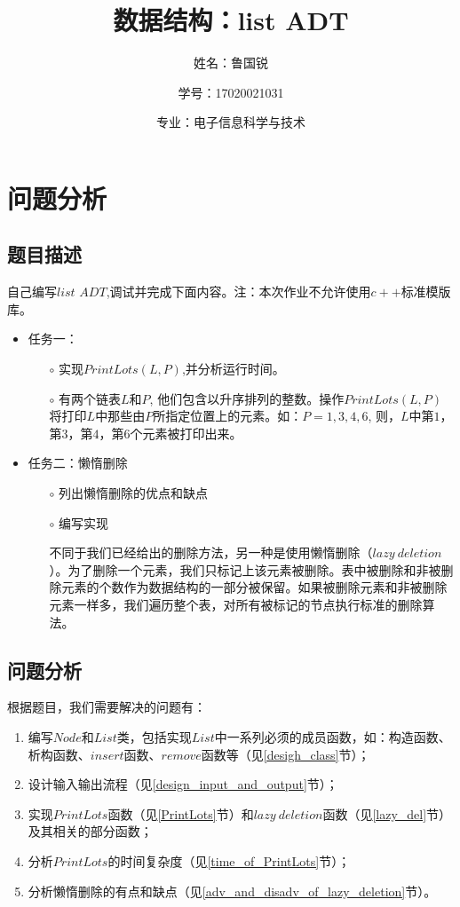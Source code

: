 \documentclass[UTF8]{ctexart}
\title{数据结构：list ADT}
\author{姓名：鲁国锐 \protect\newline
\and 学号：17020021031 \\
\and 专业：电子信息科学与技术}
\begin{document}
	\maketitle
	\renewcommand{\contentsname}{Contents}
	\tableofcontents
	\newpage
	
	\hypersetup{
	bookmarks=true,
	colorlinks=true,
	linkcolor=red,
	urlcolor=blue
	}
	\section{问题分析}
	\subsection{题目描述}
	\indent 自己编写$list$ $ADT$,调试并完成下面内容。注：本次作业不允许使用$c++$标准模版库。
	\begin{itemize}[leftmargin=60pt]
	
	\item 任务一：
	\begin{itemize}
		\item[$\circ$] 实现$PrintLots(L,P)$,并分析运行时间。
		\item[$\circ$] 有两个链表$L$和$P$, 他们包含以升序排列的整数。操作$PrintLots(L,P)$将打印$L$中那些由$P$所指定位置上的元素。如：$P={1,3,4,6}$, 则，$L$中第$1$，第$3$，第$4$，第$6$个元素被打印出来。
	\end{itemize}
		

	\item 任务二：懒惰删除
	\begin{itemize}
		\item[$\circ$] 列出懒惰删除的优点和缺点
		\item[$\circ$] 编写实现
		
		不同于我们已经给出的删除方法，另一种是使用懒惰删除（$lazy\ deletion$）。为了删除一个元素，我们只标记上该元素被删除。表中被删除和非被删除元素的个数作为数据结构的一部分被保留。如果被删除元素和非被删除元素一样多，我们遍历整个表，对所有被标记的节点执行标准的删除算法。
	\end{itemize}			
	\end{itemize}
	

	\subsection{问题分析}
	\indent 根据题目，我们需要解决的问题有：
	\begin{enumerate}[leftmargin=50pt]

	\item 编写$Node$和$List$类，包括实现$List$中一系列必须的成员函数，如：构造函数、析构函数、$insert$函数、$remove$函数等（见\ref{desigh_class}节）；
	\item 设计输入输出流程（见\ref{design_input_and_output}节）；
	\item 实现$PrintLots$函数（见\ref{PrintLots}节）和$lazy\ deletion$函数（见\ref{lazy_del}节）及其相关的部分函数；
	\item 分析$PrintLots$的时间复杂度（见\ref{time_of_PrintLots}节）；
	\item 分析懒惰删除的有点和缺点（见\ref{adv_and_disadv_of_lazy_deletion}节）。
	\end{enumerate}
	
\end{document}
